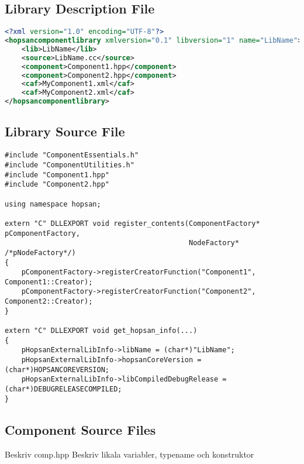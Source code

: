 \documentclass[a4paper,pdftex]{article}
\begin{document}
\subsection*{Library Description File}

\begin{lstlisting}[language=xml, basicstyle=\small\ttfamily]
<?xml version="1.0" encoding="UTF-8"?>
<hopsancomponentlibrary xmlversion="0.1" libversion="1" name="LibName">
    <lib>LibName</lib>
    <source>LibName.cc</source>
    <component>Component1.hpp</component>
    <component>Component2.hpp</component>
    <caf>MyComponent1.xml</caf>
    <caf>MyComponent2.xml</caf>
</hopsancomponentlibrary>
\end{lstlisting}


\subsection*{Library Source File}

\begin{minipage}{\linewidth}
\begin{lstlisting}[basicstyle=\footnotesize\ttfamily]
#include "ComponentEssentials.h"
#include "ComponentUtilities.h"
#include "Component1.hpp"
#include "Component2.hpp"

using namespace hopsan;

extern "C" DLLEXPORT void register_contents(ComponentFactory* pComponentFactory, 
                                            NodeFactory* /*pNodeFactory*/)
{    
    pComponentFactory->registerCreatorFunction("Component1", Component1::Creator);
    pComponentFactory->registerCreatorFunction("Component2", Component2::Creator);
}

extern "C" DLLEXPORT void get_hopsan_info(...)
{
    pHopsanExternalLibInfo->libName = (char*)"LibName";
    pHopsanExternalLibInfo->hopsanCoreVersion = (char*)HOPSANCOREVERSION;
    pHopsanExternalLibInfo->libCompiledDebugRelease = (char*)DEBUGRELEASECOMPILED;
}
\end{lstlisting}
\end{minipage}

\subsection*{Component Source Files}
Beskriv comp.hpp
Beskriv likala variabler, typename och konstruktor
\end{document}
